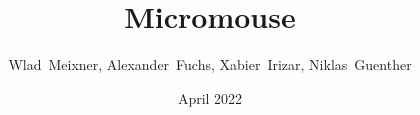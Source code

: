 \title{Micromouse}
\date{April 2022}
\author{Wlad~Meixner, Alexander~Fuchs, Xabier~Irizar, Niklas~Guenther}
\subject{Lab Report}
\publishers{}
\maketitle
\tableofcontents
\clearpage

